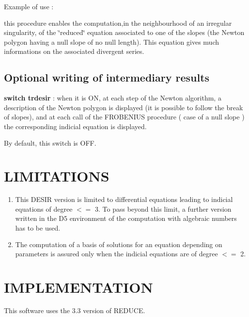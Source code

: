 \documentclass[a4paper]{article}
\begin{document}
Example of use : \par

this procedure enables the computation,in the neighbourhood of an irregular
singularity, of the \char`\"{}reduced\char`\"{} equation associated to one
of the slopes (the Newton polygon having a null slope of no null length). 
This equation gives much informations on the associated divergent series.

\subsection{Optional writing of intermediary results}

{\bf switch trdesir} : when it is ON, at each step of the Newton algorithm, a
description of the Newton polygon is displayed (it is possible to follow
the break of slopes), and at each call of the FROBENIUS procedure ( case of
a null slope ) the corresponding indicial equation is displayed. \par

By default, this switch is OFF.

\section{LIMITATIONS}

\begin{enumerate}
\item This DESIR version is limited to differential equations leading
to indicial equations of degree $<=$ 3. To pass beyond this limit, a further
version written in the D5 environment of the computation with algebraic
numbers has to be used.
\item The computation of a basis of solutions for an equation depending on
parameters is assured only when the indicial equations are of degree $<=$ 2.
\end{enumerate}

\section{IMPLEMENTATION}

This software uses the 3.3 version of REDUCE.
\end{document}
